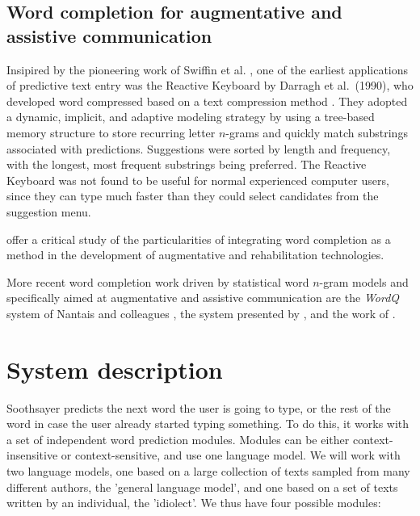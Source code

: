 \documentclass[12pt]{article}
\begin{document}

\subsection{Word completion for augmentative and assistive communication}

Insipired by the pioneering work of Swiffin et al. \citeyear{Swiffin+85}, one of the earliest applications of predictive text entry was the Reactive Keyboard by Darragh et al.~(1990), who developed word compressed based on a text compression method \cite{Darragh+90}. They adopted a dynamic, implicit, and adaptive modeling strategy by using a tree-based memory structure to store recurring letter $n$-grams and quickly match substrings associated with predictions. Suggestions were sorted by length and frequency, with the longest, most frequent substrings being preferred. The Reactive Keyboard was not found to be useful for normal experienced computer users, since they can type much faster than they could select candidates from the suggestion menu. 

 offer a critical study of the particularities of integrating word completion as a method in the development of augmentative and rehabilitation technologies.

More recent word completion work driven by statistical word $n$-gram models and specifically aimed at augmentative and assistive communication are the {\it WordQ}\/ system of Nantais and colleagues \cite{Nantais+01,Shein+01}, the system presented by , and the work of .

\section{System description} \label{algorithm}

Soothsayer predicts the next word the user is going to type, or the rest of the word in case the user already started typing something. To do this, it works with a set of independent word prediction modules. Modules can be either context-insensitive or context-sensitive, and use one language model. We will work with two language models, one based on a large collection of texts sampled from many different authors, the 'general language model', and one based on a set of texts written by an individual, the 'idiolect'. We thus have four possible modules:
\end{document}
